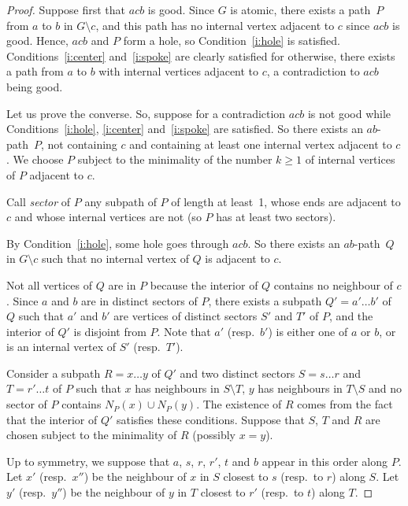 \documentclass[11pt]{article}
\newcommand{\sm}{\setminus}
\begin{document}
\begin{proof}
  Suppose first that $acb$ is good.  Since $G$ is atomic, there exists a path~$P$ from $a$ to $b$ in $G\sm c$, and this path has no internal vertex adjacent to $c$ since $acb$ is good. Hence, $acb$ and $P$ form a hole, so Condition~\ref{i:hole} is satisfied.  Conditions~\ref{i:center} and~\ref{i:spoke} are clearly satisfied for otherwise, there exists a path from $a$ to $b$ with internal vertices adjacent to $c$, a contradiction to $acb$ being good. 
  
  Let us prove the converse. So, suppose for a contradiction $acb$ is not good while Conditions~\ref{i:hole}, \ref{i:center} and~\ref{i:spoke} are satisfied. 
  So there exists an $ab$-path~$P$, not containing $c$ and containing at least one internal vertex adjacent to $c$.  We choose $P$ subject to the minimality of the  number $k\geq 1$ of internal vertices of $P$ adjacent to $c$.   
  
  Call \emph{sector} of $P$ any subpath of $P$ of length at least~1, whose ends are adjacent to $c$ and whose internal vertices are not (so $P$ has at least two sectors). 
  
  By Condition~\ref{i:hole}, some hole goes through $acb$. So there exists an $ab$-path~$Q$ in $G\sm c$ such that no internal vertex of $Q$ is adjacent to $c$. 
  
  Not all vertices of $Q$ are in $P$ because the interior of $Q$ contains no neighbour of $c$. 
  Since $a$ and $b$ are in distinct sectors of $P$, there exists a subpath $Q'= a'\dots b'$ of $Q$ such that $a'$ and $b'$ are vertices of distinct sectors $S'$ and $T'$ of $P$, and the interior of $Q'$ is disjoint from $P$. Note that $a'$ (resp.\ $b'$) is either one of $a$ or $b$, or is an internal vertex of $S'$ (resp.\ $T'$). 

  Consider a subpath $R= x \dots y$ of $Q'$ and two distinct sectors $S = s\dots r$ and $T = r'\dots t$ of $P$ such that $x$ has neighbours in $S\sm T$, $y$ has neighbours in $T\sm S$ and no sector of $P$ contains $N_P(x) \cup N_P(y)$. 
  The existence of $R$ comes from the fact that the interior of $Q'$  satisfies these conditions.  
  Suppose that $S$, $T$ and $R$ are chosen subject to the minimality of $R$ (possibly $x=y$). 
  
  Up to symmetry, we suppose that $a$, $s$, $r$, $r'$, $t$ and $b$ appear in this order along $P$.  
  Let $x'$ (resp.\ $x''$) be the neighbour of $x$ in $S$ closest to $s$ (resp.\ to $r$) along $S$.  Let $y'$ (resp.\ $y''$) be the neighbour of $y$ in $T$ closest to $r'$ (resp.\ to $t$) along $T$. 
  

\end{proof}
\end{document}
